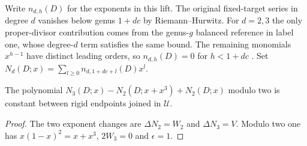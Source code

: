 Write $n_{d,h}(D)$ for the exponents in this lift. The original
fixed-target series in degree $d$ vanishes below genus $1+dc$ by
Riemann--Hurwitz. For $d=2,3$ the only proper-divisor contribution
comes from the genus-$g$ balanced reference in label one, whose
degree-$d$ term satisfies the same bound. The remaining monomials
$x^{h-1}$ have distinct leading orders, so $n_{d,h}(D)=0$ for
$h<1+dc$ \cite[Proposition~3.1 and Corollary~3.2]{WueUnramified}. Set
$N_d(D;x)=\sum_{l\ge0} n_{d,1+dc+l}(D)x^l$.
\begin{corollary}
The polynomial $N_3(D;x)-N_2(D;x+x^3)+N_2(D;x)$ modulo two is
constant between rigid endpoints joined in $\mathcal U$.
\end{corollary}
\begin{proof}
The two exponent changes are $\Delta N_2=W_2$ and $\Delta N_3=V$.
Modulo two one has $x(1-x)^2=x+x^3$, $2W_3=0$ and $\epsilon=1$.
\end{proof}
